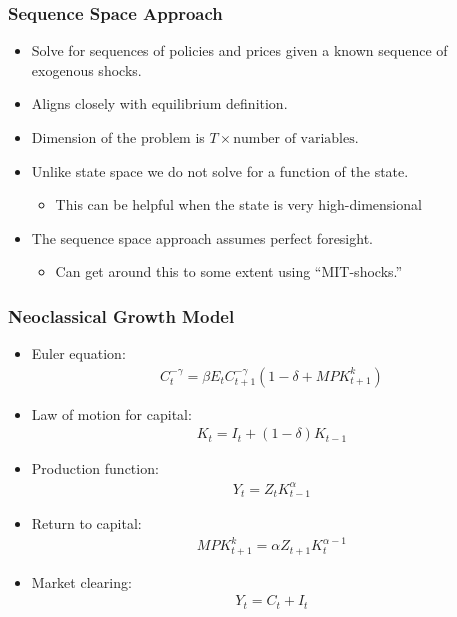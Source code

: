 \documentclass[english,xcolor=svgnames]{beamer}
\begin{document}
\begin{frame}
    \frametitle{Sequence Space Approach}
    \begin{itemize}
        \item Solve for sequences of policies and prices given a known sequence of exogenous shocks.
        \item Aligns closely with equilibrium definition.
        \item Dimension of the problem is $T \times \text{number of variables}$.
       \item Unlike state space we do not solve for a function of the state.
       \begin{itemize}
		\item This can be helpful when the state is very high-dimensional
	   \end{itemize}
        \item The sequence space approach assumes perfect foresight. 
        \begin{itemize}
			\item Can get around this to some extent using ``MIT-shocks.''
		   \end{itemize}
	\end{itemize}
\end{frame}

\begin{frame}
	\frametitle{Neoclassical Growth Model}
	\begin{itemize}
		\item Euler equation:
		\begin{align*}
			C_t^{-\gamma}  = \beta E_t C_{t+1}^{-\gamma} (1-\delta+MPK_{t+1}^k)
		\end{align*}
		\item Law of motion for capital:
		\begin{align*}
			K_{t} = I_t + (1-\delta)K_{t-1}
		\end{align*}
		\item Production function:
		\begin{align*}
			Y_t = Z_t K_{t-1}^\alpha
		\end{align*}
		\item Return to capital:
		\begin{align*}
			MPK_{t+1}^k = \alpha Z_{t+1} K_t^{\alpha-1}
		\end{align*}
		\item Market clearing:
		\begin{align*}
			Y_t = C_t + I_t
		\end{align*}
	 \end{itemize}
 \end{frame}
\end{document}

